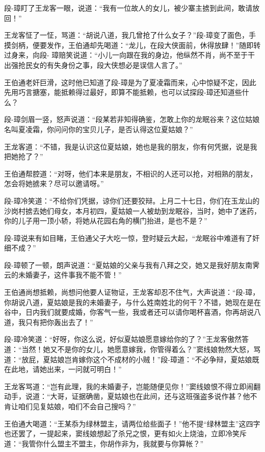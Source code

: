 \documentclass[12pt,oneside]{book}
\begin{document}
段-璋盯了王龙客一眼，说道：``我有一位故人的女儿，被少寨主掳到此间，敢请放回！''

王龙客怔了一怔，骂道：``胡说八道，我几曾抢了什么女子？''段-璋变了面色，手摸剑柄，便要发作，王伯通却先喝道：``龙儿，在段大侠面前，休得放肆！''随即转过身来，向段-
璋赔笑说道：``小儿一向跟在我的身边，他纵然不肖，尚不至于干出强抢民女的有失身份之事，段大侠想必是误信人言了。''

王伯通老奸巨滑，这时他已知道了段-璋是为了夏凌霜而来，心中惊疑不定，因此先用巧言搪塞，能抵赖得过最好，即算不能抵赖，也可以试探段-璋还知道些什么？

段-璋剑眉一竖，怒声说道：``段某若非知得确鉴，怎敢上你的龙眠谷来？这位姑娘名叫夏凌霜，你问问你的宝贝儿子，是否认得这位夏姑娘？''

王龙客道：``不错，我是认识这位夏姑娘，她也是我的朋友，你有何凭据，说是我把她抢了？''

王伯通帮腔道：``对呀，他们本来是朋友，不相识的人还可以抢，对相熟的朋友，怎会将她掳来？尽可以邀请呀。''

段-璋冷笑道：``不给你们凭据，谅你们还要狡辩。上月二十七日，你们在玉龙山的沙岗村掳去她们母女，本月初四，夏姑娘一人被劫到龙眠谷，当时，她中了迷药，你的儿子用一顶小轿，将她从花园右角的横门抬进，是也不是？''

段-璋说来有如目睹，王伯通父子大吃一惊，登时疑云大起，``龙眠谷中难道有了奸细不成？''

段-璋顿了一顿，朗声说道：``夏姑娘的父亲与我有八拜之交，她又是我好朋友南霁云的未婚妻子，这件事我不能不管！''

王伯通尚想抵赖，尚想问他要人证物证，王龙客却忍不住气，大声说道：``段-璋，你胡说八道，夏姑娘是我的未婚妻子，与什么姓南姓北的何干？不错，她现在是在谷中，日内我们就要成婚，你客气一些，我或者还可以请你喝杯喜酒，你再胡说八道，我只有把你轰出去了！''

段-璋冷笑道：``好呀，你这么说，好似夏姑娘愿意嫁给你的了？''王龙客傲然答道：``当然！她又不是你的女儿，她愿意嫁我，你管得着么？''窦线娘勃然大怒，骂道：``放屁，夏姑娘岂肯嫁你这个不成材的小贼！''段-璋道：``不必争辩，夏姑娘既在此地，请她出来，一问就可明白！''

王龙客骂道：``岂有此理，我的未婚妻子，岂能随便见你！''窦线娘恨不得立即闹翻动手，说道：``大哥，证据确凿，夏姑娘也在此间，还与这班强盗多说作甚？他不肯让咱们见复姑娘，咱们不会自己搜吗？''

王伯通大喝道：``王某忝为绿林盟主，请两位给些面子！''他不提``绿林盟主''这四字也还罢了，一提起来，窦线娘想起了杀兄之恨，更有如火上烧油，立即冷笑斥道：``我管你什么盟主不盟主，你胡作非为，我就要与你算帐？''
\end{document}
